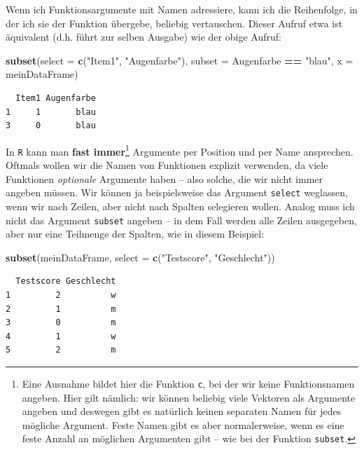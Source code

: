 \documentclass[12pt,]{tufte-book}
\newenvironment{Shaded}{\begin{snugshade}}{\end{snugshade}}
\newcommand{\KeywordTok}[1]{\textcolor[rgb]{0.13,0.29,0.53}{\textbf{#1}}}
\newcommand{\DataTypeTok}[1]{\textcolor[rgb]{0.13,0.29,0.53}{#1}}
\newcommand{\StringTok}[1]{\textcolor[rgb]{0.31,0.60,0.02}{#1}}
\newcommand{\OperatorTok}[1]{\textcolor[rgb]{0.81,0.36,0.00}{\textbf{#1}}}
\newcommand{\NormalTok}[1]{#1}
\theoremstyle{definition}
\theoremstyle{definition}
\theoremstyle{definition}
\theoremstyle{remark}
\begin{document}
Wenn ich Funktionsargumente mit Namen adressiere, kann ich die
Reihenfolge, in der ich sie der Funktion übergebe, beliebig vertauschen.
Dieser Aufruf etwa ist äquivalent (d.h. führt zur selben Ausgabe) wie
der obige Aufruf:

\begin{Shaded}
\begin{Highlighting}[]
\KeywordTok{subset}\NormalTok{(}\DataTypeTok{select =} \KeywordTok{c}\NormalTok{(}\StringTok{"Item1"}\NormalTok{, }\StringTok{"Augenfarbe"}\NormalTok{),}
       \DataTypeTok{subset =}\NormalTok{ Augenfarbe }\OperatorTok{==}\StringTok{ "blau"}\NormalTok{, }\DataTypeTok{x =}\NormalTok{ meinDataFrame)}
\end{Highlighting}
\end{Shaded}

\begin{verbatim}
  Item1 Augenfarbe
1     1       blau
3     0       blau
\end{verbatim}

In \texttt{R} kann man \textbf{fast immer}\footnote{Eine Ausnahme bildet
  hier die Funktion \texttt{c}, bei der wir keine Funktionsnamen
  angeben. Hier gilt nämlich: wir können beliebig viele Vektoren als
  Argumente angeben und deswegen gibt es natürlich keinen separaten
  Namen für jedes mögliche Argument. Feste Namen gibt es aber
  normalerweise, wenn es eine feste Anzahl an möglichen Argumenten gibt
  -- wie bei der Funktion \texttt{subset}.} Argumente per Position und
per Name ansprechen. Oftmals wollen wir die Namen von Funktionen
explizit verwenden, da viele Funktionen \emph{optionale} Argumente haben
-- also solche, die wir nicht immer angeben müssen. Wir können ja
beispielsweise das Argument \texttt{select} weglassen, wenn wir nach
Zeilen, aber nicht nach Spalten selegieren wollen. Analog muss ich nicht
das Argument \texttt{subset} angeben -- in dem Fall werden alle Zeilen
ausgegeben, aber nur eine Teilmenge der Spalten, wie in diesem Beispiel:

\begin{Shaded}
\begin{Highlighting}[]
\KeywordTok{subset}\NormalTok{(meinDataFrame, }\DataTypeTok{select =} \KeywordTok{c}\NormalTok{(}\StringTok{"Testscore"}\NormalTok{, }
    \StringTok{"Geschlecht"}\NormalTok{))}
\end{Highlighting}
\end{Shaded}

\begin{verbatim}
  Testscore Geschlecht
1         2          w
2         1          m
3         0          m
4         1          w
5         2          m
\end{verbatim}
\end{document}
